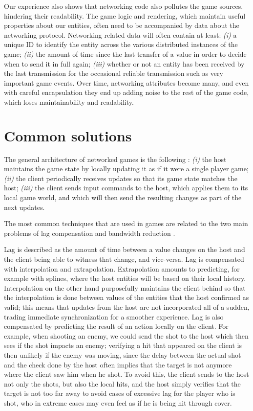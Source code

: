 Our experience also shows that networking code also pollutes the game sources, hindering their readability. The game logic and rendering, which maintain useful properties about our entities, often need to be accompanied by data about the networking protocol. Networking related data will often contain at least: \textit{(i)} a unique ID to identify the entity across the various distributed instances of the game; \textit{(ii)} the amount of time since the last transfer of a value in order to decide when to send it in full again; \textit{(iii)} whether or not an entity has been received by the last transmission for the occasional reliable transmission such as very important game events. Over time, networking attributes become many, and even with careful encapsulation they end up adding noise to the rest of the game code, which loses maintainability and readability. 


\section{Common solutions}
The general architecture of networked games is the following \cite{APPENDIX_B_NETWORKING_DIFFICULTIES}: \textit{(i)} the host maintains the game state by locally updating it as if it were a single player game; \textit{(ii)} the client periodically receives updates so that its game state matches the host; \textit{(iii)} the client sends input commands to the host, which applies them to its local game world, and which will then send the resulting changes as part of the next updates.

The most common techniques that are used in games are related to the two main problems of lag compensation and bandwidth reduction \cite{APPENDIX_B_NETWORKING_DIFFICULTIES}.

Lag is described as the amount of time between a value changes on the host and the client being able to witness that change, and vice-versa. Lag is compensated with interpolation and extrapolation. Extrapolation amounts to predicting, for example with splines, where the host entities will be based on their local history. Interpolation on the other hand purposefully maintains the client behind so that the interpolation is done between values of the entities that the host confirmed as valid; this means that updates from the host are not incorporated all of a sudden, trading immediate synchronization for a smoother experience. Lag is also compensated by predicting the result of an action locally on the client. For example, when shooting an enemy, we could send the shot to the host which then sees if the shot impacts an enemy; verifying a hit that appeared on the client is then unlikely if the enemy was moving, since the delay between the actual shot and the check done by the host often implies that the target is not anymore where the client saw him when he shot. To avoid this, the client sends to the host not only the shots, but also the local hits, and the host simply verifies that the target is not too far away to avoid cases of excessive lag for the player who is shot, who in extreme cases may even feel as if he is being hit through cover.

